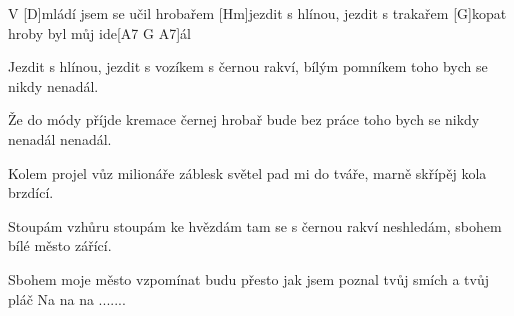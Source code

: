 
V [D]mládí jsem se učil hrobařem
[Hm]jezdit s hlínou, jezdit s trakařem
[G]kopat hroby byl můj ide[A7 G A7]\null ál 

Jezdit s hlínou, jezdit s vozíkem
s černou rakví, bílým pomníkem
toho bych se nikdy nenadál.

Že do módy příjde kremace
černej hrobař bude bez práce
toho bych se nikdy nenadál nenadál.

Kolem projel vůz milionáře
záblesk světel pad mi do tváře,
marně skřípěj kola brzdící.

Stoupám vzhůru stoupám ke hvězdám
tam se s černou rakví neshledám,
sbohem bílé město zářící.

Sbohem moje město
vzpomínat budu přesto
jak jsem poznal tvůj smích a tvůj pláč Na na na .......

